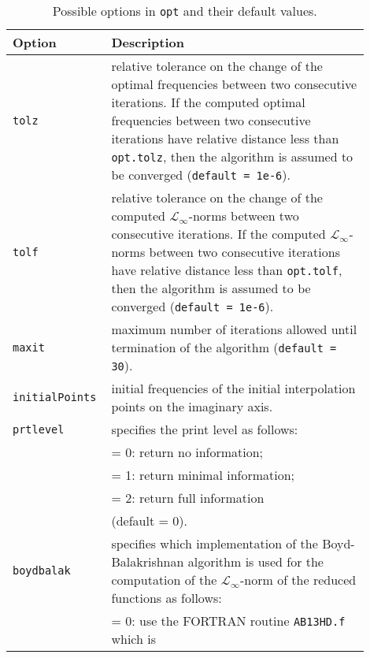 \documentclass[10pt,a4paper]{article}
\begin{document}
\begin{longtable}{p{0.2\linewidth}p{0.7\linewidth}}
\caption{Possible options in \texttt{opt} and their default values.} \\
\label{tab:opt}
\centering
\textbf{Option}   & \textbf{Description} \\ \hline
\texttt{tolz}          & relative tolerance on the change of the optimal
                         frequencies between two consecutive iterations.
                         If the computed optimal frequencies between two
                         consecutive iterations have relative distance
                         less than \texttt{opt.tolz}, then the algorithm is
                         assumed to be converged (\texttt{default = 1e-6}). \\ \hline
\texttt{tolf}          & relative tolerance on the change of the
                         computed $\mathcal{L}_\infty$-norms between two 
                         consecutive iterations. If the computed 
                         $\mathcal{L}_\infty$-norms between two consecutive
                         iterations have relative distance less than
                         \texttt{opt.tolf}, then the algorithm is assumed to be
                         converged (\texttt{default = 1e-6}).\\ \hline
\texttt{maxit}         & maximum number of iterations allowed until 
                         termination of the algorithm (\texttt{default = 30}). \\ \hline
\texttt{initialPoints} & initial frequencies of the initial 
                         interpolation points on the imaginary axis. \\ \hline
\texttt{prtlevel}      & specifies the print level as follows: \\
                       & = 0: return no information; \\
                       & = 1: return minimal information; \\
                       & = 2: return full information \\
                       & (default = 0).\\ \hline
\texttt{boydbalak}     & specifies which implementation of the  
                         Boyd-Balakrishnan algorithm is used for the 
                         computation of the $\mathcal{L}_\infty$-norm of the 
                         reduced functions as follows: \\
                       & = 0: use the FORTRAN routine \texttt{AB13HD.f} which is

\end{longtable}
\end{document}

